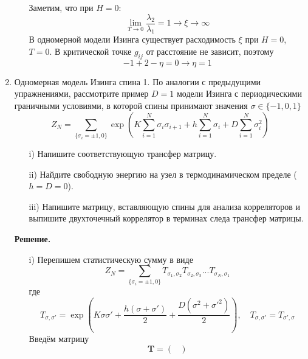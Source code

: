 \documentclass[12pt]{article}
\theoremstyle{definition}
\begin{document}
\begin{enumerate}
\begin{itemize}
\begin{equation}
    \end{equation}
    Заметим, что при $H=0$:
    \begin{equation}
        \lim\limits_{T\rightarrow0}\frac{\lambda_2}{\lambda_1}=1\rightarrow\xi\rightarrow\infty
    \end{equation}
    В одномерной модели Изинга существует расходимость $\xi$ при $H=0$, $T=0$. В критической точке $g_{ij}$ от расстояние не зависит, поэтому
    \begin{equation}
        -1+2-\eta=0\rightarrow\boxed{\eta=1}
    \end{equation}
    \end{itemize}
    \item Одномерная модель Изинга спина 1. По аналогии с предыдущими упражнениями, рассмотрите пример $D=1$ модели Изинга с периодическими граничными условиями, в которой спины принимают значения $\sigma\in\{-1,0,1\}$
    \begin{equation}
        Z_N=\sum\limits_{\{\sigma_i=\pm1,0\}}\exp\left(K\sum\limits_{i=1}^N\sigma_i\sigma_{i+1}+h\sum\limits_{i=1}^N\sigma_i+D\sum_{i=1}^N\sigma_i^2\right)
    \end{equation}
    \begin{itemize}
        \item[i)] Напишите соответствующую трансфер матрицу.
        \item[ii)] Найдите свободную энергию на узел в термодинамическом пределе ($h=D=0$).
        \item[iii)] Напишите матрицу, вставляющую спины для анализа корреляторов и выпишите двухточечный коррелятор в терминах следа трансфер матрицы.
    \end{itemize}
    \textbf{Решение.}
    \begin{itemize}
        \item[i)] Перепишем статистическую сумму в виде
        \begin{equation}
            Z_N=\sum\limits_{\{\sigma_i=\pm1,0\}}T_{\sigma_1,\sigma_2}T_{\sigma_2,\sigma_3}...T_{\sigma_N,\sigma_1}
        \end{equation}
        где
        \begin{equation}
            T_{\sigma,\sigma'}=\exp\left(K\sigma\sigma'+\frac{h(\sigma+\sigma')}{2}+\frac{D(\sigma^2+\sigma'^2)}{2}\right),\quad T_{\sigma,\sigma'}=T_{\sigma',\sigma}
        \end{equation}
        Введём матрицу
        \begin{equation}
            \textbf{T}=\begin{pmatrix}

\end{pmatrix}
\end{equation}
\end{itemize}
\end{enumerate}
\end{document}
